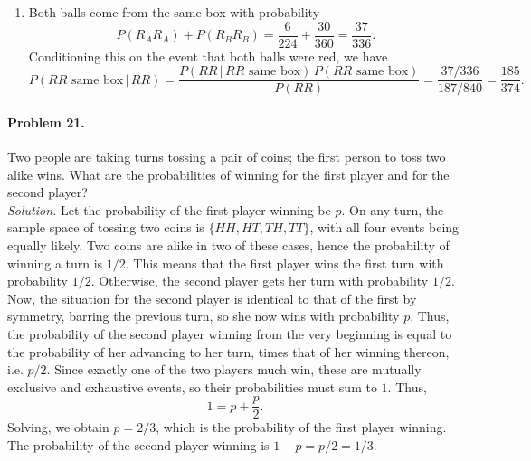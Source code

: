 \documentclass[10pt]{article}
\begin{document}
\begin{enumerate}
                \item Both balls come from the same box with probability
                \[
                        P(R_AR_A) + P(R_BR_B) = \frac{6}{224} + \frac{30}{360} = \frac{37}{336}.
                \]
                Conditioning this on the event that both balls were red, we have
                \[
                        P(RR \text{ same box} \,|\, RR) = \frac{P(RR \,|\, RR \text{ same box})\, P(RR \text{ same box})}{P(RR)} = 
                                \frac{37 /336}{187 /840} = \frac{185}{374}.
                \]
        \end{enumerate}

        \paragraph{Problem 21.}
        Two people are taking turns tossing a pair of coins; the first person to toss two alike wins.
        What are the probabilities of winning for the first player and for the second player? \\

        \textit{Solution.} Let the probability of the first player winning be $p$. On any turn, the sample space of tossing
        two coins is $\{H H, H T, T H, T T\}$, with all four events being equally likely. Two coins are alike in two of these cases,
        hence the probability of winning a turn is $1 /2$. This means that the first player wins the first turn with probability $1 /2$.
        Otherwise, the second player gets her turn with probability $1 /2$. Now, the situation for the second player is identical to that
        of the first by symmetry, barring the previous turn, so she now wins with probability $p$. Thus, the probability of the second
        player winning from the very beginning is equal to the probability of her advancing to her turn, times that of her winning thereon,
        i.e. $p /2$. Since exactly one of the two players much win, these are mutually exclusive and exhaustive events, so their
        probabilities must sum to $1$. Thus,
        \[
                1 = p + \frac{p}{2}.
        \]
        Solving, we obtain $p = 2 /3$, which is the probability of the first player winning. The probability of the second player winning
        is $1 - p = p /2 = 1 /3$.
\end{document}
